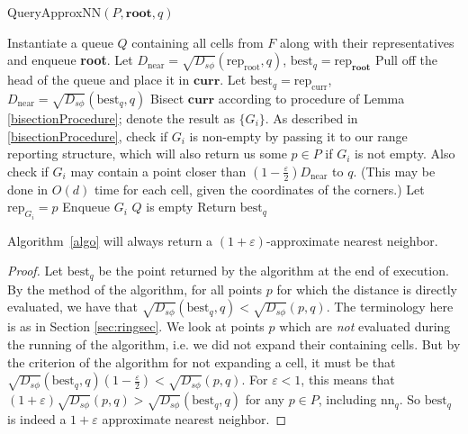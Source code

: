 \documentclass[11pt]{myclass}
\newcommand{\sbreg}{\ensuremath{D_{s\phi}}}
\newcommand{\eps}{\varepsilon}
\begin{document}
\begin{algorithm}
  \caption{QueryApproxNN$(P,\mathbf{root},q)$}
  \begin{algorithmic}
    \STATE Instantiate a queue $Q$ containing all cells from $F$ along with their representatives and 
           enqueue \textbf{root}.
    \STATE Let $D_{\text{near}} =\sqrt{\sbreg}(\text{rep}_{\text{root}}, q)$,
    $\text{best}_q = \text{rep}_{\mathbf{root}}$
    \REPEAT 
    \STATE Pull off the head of the queue and place it in $\mathbf{curr}$.
    \IF{$\sqrt{\sbreg}(\text{rep}_{\text{curr}}, q) < \sqrt{\sbreg}(\text{best}_q, q)$}
      \STATE Let $\text{best}_q = \text{rep}_{\text{curr}}$, 
             $D_{\text{near}} = \sqrt{\sbreg}(\text{best}_q, q)$
      \STATE Bisect $\textbf{curr}$ according to procedure of Lemma   
             \ref{bisectionProcedure}; denote the result as $\{G_i\}$.
        \STATE As described in \ref{bisectionProcedure}, check if $G_i$ is non-empty by passing it to our range reporting structure, which will also return us some $p \in P$  if $G_i$ is not empty. 
        \STATE Also check if $G_i$  may contain a point closer than $(1- \frac{\eps}{2}) D_{\text{near}}$ to $q$. (This may be done in $O(d)$ time for each cell, given the coordinates of the corners.) 
          \STATE Let $\text{rep}_{G_i} = p$
          \STATE Enqueue $G_i$
        \ENDIF
      \ENDFOR
    \ENDIF
    \UNTIL $Q$ is empty
    \STATE Return $\text{best}_q$
  \end{algorithmic}
  \label{algo}
\end{algorithm}
\begin{lemma}\label{correctness}
Algorithm~\ref{algo} will always return a $(1+\eps)$-approximate nearest neighbor. 
\end{lemma}
\begin{proof}
Let $\text{best}_q$ be the point returned by the algorithm at the end of execution. By the method of the algorithm, for all points $p$ for which the distance is directly evaluated, we have that
$
\sqrt{\sbreg}(\text{best}_q, q) < \sqrt{\sbreg}(p,q) 
$. 
The terminology here is as in Section \ref{sec:ringsec}.
We look at points $p$ which are \emph{not} evaluated during the running of the algorithm, 
i.e. we did not expand their containing cells. But by the criterion of the algorithm for not expanding a cell, it must be that $\sqrt{\sbreg}(\text{best}_q, q) (1 - \frac{\eps}{2}) < \sqrt{\sbreg}(p,q)$. For $\eps <1$, this means that $(1+ \eps)\sqrt{\sbreg}(p,q)  > \sqrt{\sbreg}(\text{best}_q,q)$ for any $p \in P$, including $\text{nn}_q$. So $\text{best}_q$ is indeed a $1 + \eps$ approximate nearest neighbor.
\end{proof}
\end{document}
